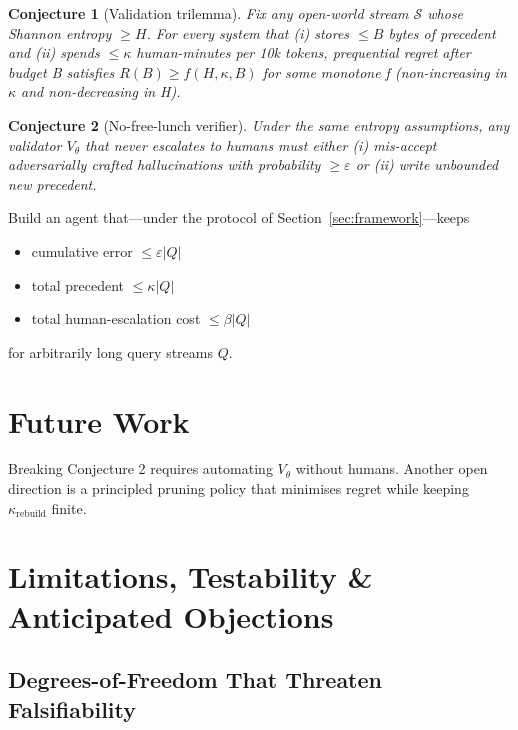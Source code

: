 \documentclass[11pt]{article}
\begin{document}
\newtheorem{conjecture}{Conjecture}
\begin{conjecture}[Validation trilemma] \label{conjecture1} Fix any open-world stream \(\mathcal{S}\) whose Shannon entropy \(\geq H\).
For every system that (i) stores \(\leq B\) bytes of precedent
and (ii) spends \(\leq \kappa\) human-minutes per 10k tokens, prequential regret
after budget B satisfies   \( R(B) \geq f(H, \kappa, B) \)   for some monotone f (non-increasing in \(\kappa\) and non-decreasing in H).
\end{conjecture}

\begin{conjecture}[No-free-lunch verifier] \label{conjecture2} Under the same entropy
assumptions, any validator \(V_\theta\) that never escalates to humans must either
(i) mis-accept adversarially crafted hallucinations with probability \(\geq \varepsilon\)
or (ii) write unbounded new precedent.
\end{conjecture}

\begin{tcolorbox}[title=Falsify-Us]
  Build an agent that—under the protocol of Section~\ref{sec:framework}—keeps
  \begin{itemize}
    \item cumulative error $\leq \varepsilon|Q|$
    \item total precedent $\leq \kappa|Q|$
    \item total human-escalation cost $\leq \beta|Q|$
  \end{itemize}
  for arbitrarily long query streams $Q$.
\end{tcolorbox}

\section{Future Work}
\label{sec:conclusion}
Breaking Conjecture 2 requires automating $V_\theta$ without humans. Another open direction is a principled pruning policy that minimises regret while keeping \(\kappa_{\text{rebuild}}\) finite.

\appendix
\section{Limitations, Testability \& Anticipated Objections}
\label{app:limits}

\subsection{\quad Degrees-of-Freedom That Threaten Falsifiability}
\label{sec:knobs}
\end{document}
